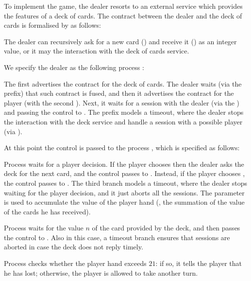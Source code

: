To implement the game, the dealer resorts to an external service
which provides the features of a deck of cards.
The contract between the dealer and the deck of cards is 
formalised by  as follows:

The dealer can recursively 
ask for a new card () and receive it ()
as an integer value,
or it may  the interaction with the deck of cards service.

We specify the dealer as the following process :

The first  advertises the contract for the
deck of cards.
The dealer waits (via the  prefix) that such contract
is fused, 
and then it advertises the contract for the player 
(with the second ). Next, it waits for a session with
the dealer (via the ) and passing the control to .
The prefix  models a timeout, where the dealer stops the interaction with the deck service and handle a session with a possible player (via ).

At this point the control is passed to the process
, which is specified as follows:


Process  waits for a player decision.
If the player chooses  
then the dealer asks the deck for the next card,
and the control passes to .
Instead, if the player chooses ,
the control passes to .
The third branch models a timeout, 
where the dealer stops waiting for the player decision, 
and it just aborts all the sessions.
The parameter  is used to accumulate the value of the player hand
(\ie, the summation of the value of the cards he has received).


Process  waits for the value $n$ of the card
provided by the deck, and then passes the control to .
Also in this case, a timeout branch ensures that sessions are aborted
in case the deck does not reply timely.


Process  checks whether the player hand exceeds $21$:
if so, it tells the player that he has lost; 
otherwise, the player is allowed to take another turn.

